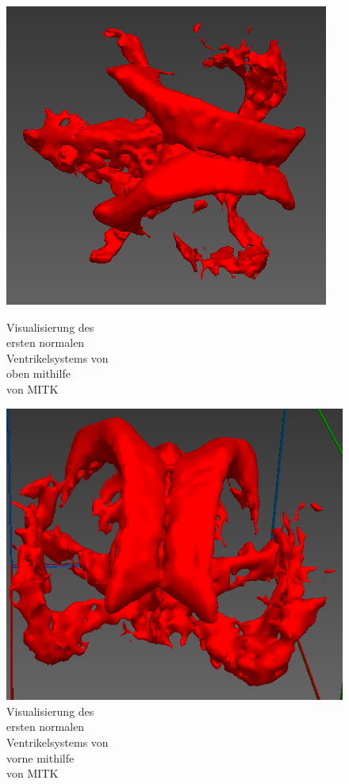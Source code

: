 \begin{figure}[h]
\begin{minipage}[t]{.5\textwidth}
  \centering
  \includegraphics[width=.9\linewidth, height=.9\linewidth]{Logos/Normal1_MITK/Oben.PNG}
  \caption{Visualisierung des \\ ersten normalen \\ Ventrikelsystems von \\ oben mithilfe \\ von MITK}
  \label{fig:mitk_o}
\end{minipage}%
\begin{minipage}[t]{.5\textwidth}
  \centering
  \includegraphics[width=.9\linewidth, height=.9\linewidth]{Logos/Normal1_MITK/Schraeg_Vorne.PNG}
  \caption{Visualisierung des \\ ersten normalen \\ Ventrikelsystems von \\ vorne mithilfe \\ von MITK}
  \label{fig:mitk_v}
\end{minipage}
\end{figure}


